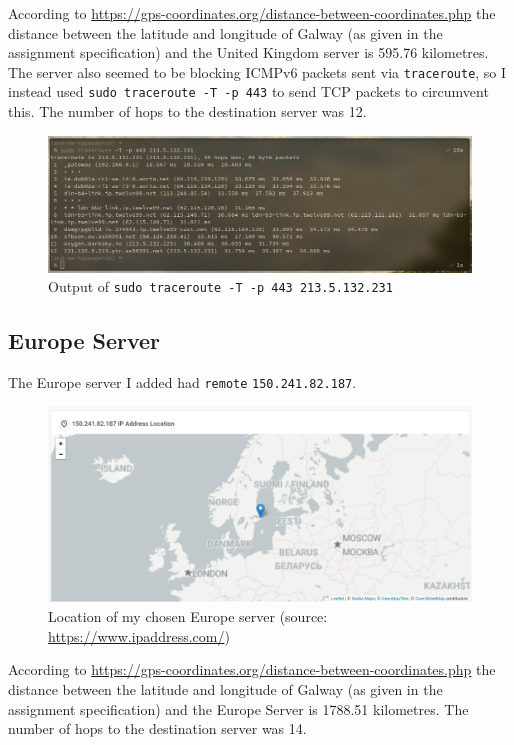 \documentclass[a4paper]{article}
\begin{document}
According to \url{https://gps-coordinates.org/distance-between-coordinates.php} the distance between the latitude and longitude of Galway (as given in the assignment specification) and the United Kingdom server is 595.76 kilometres.
The server also seemed to be blocking ICMPv6 packets sent via \verb|traceroute|, so I instead used \texttt{sudo traceroute -T -p 443} to send TCP packets to circumvent this.
The number of hops to the destination server was 12.

\begin{figure}[H]
    \centering
    \includegraphics[width=\textwidth]{./images/uktraceroute.png}
    \caption{Output of \texttt{sudo traceroute -T -p 443 213.5.132.231}}
\end{figure}

\subsection{Europe Server}
The Europe server I added had \verb|remote| \verb|150.241.82.187|.

\begin{figure}[H]
    \centering
    \includegraphics[width=\textwidth]{./images/europeserverloc.png}
    \caption{Location of my chosen Europe server (source: \url{https://www.ipaddress.com/})}
\end{figure}

According to \url{https://gps-coordinates.org/distance-between-coordinates.php} the distance between the latitude and longitude of Galway (as given in the assignment specification) and the Europe Server is 1788.51 kilometres.
The number of hops to the destination server was 14.
\end{document}
